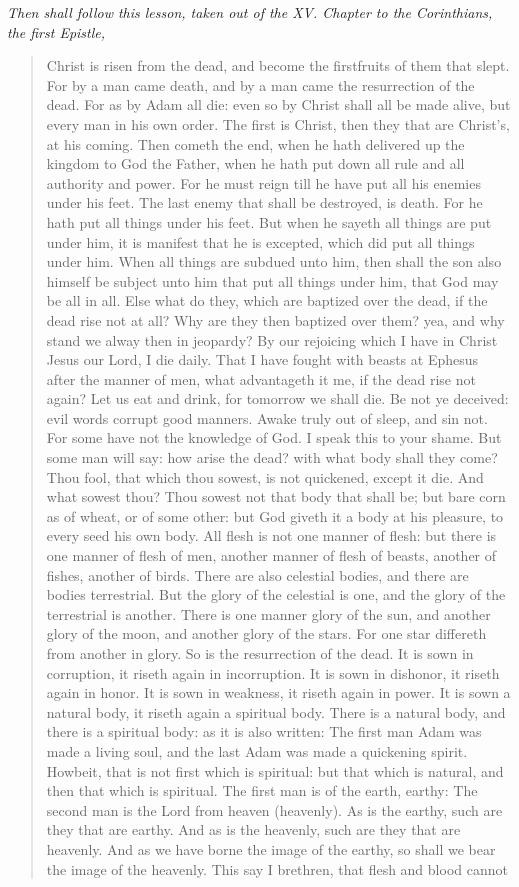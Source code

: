 \documentclass[
]{book}
\begin{document}
\emph{Then shall follow this lesson, taken out of the XV. Chapter to the Corinthians, the first Epistle,}

\begin{quote}
Christ is risen from the dead, and become the firstfruits of them that slept. For by a man came death, and by a man came the resurrection of the dead. For as by Adam all die: even so by Christ shall all be made alive, but every man in his own order. The first is Christ, then they that are Christ's, at his coming. Then cometh the end, when he hath delivered up the kingdom to God the Father, when he hath put down all rule and all authority and power. For he must reign till he have put all his enemies under his feet. The last enemy that shall be destroyed, is death. For he hath put all things under his feet. But when he sayeth all things are put under him, it is manifest that he is excepted, which did put all things under him. When all things are subdued unto him, then shall the son also himself be subject unto him that put all things under him, that God may be all in all. Else what do they, which are baptized over the dead, if the dead rise not at all? Why are they then baptized over them? yea, and why stand we alway then in jeopardy? By our rejoicing which I have in Christ Jesus our Lord, I die daily. That I have fought with beasts at Ephesus after the manner of men, what advantageth it me, if the dead rise not again? Let us eat and drink, for tomorrow we shall die. Be not ye deceived: evil words corrupt good manners. Awake truly out of sleep, and sin not. For some have not the knowledge of God. I speak this to your shame. But some man will say: how arise the dead? with what body shall they come? Thou fool, that which thou sowest, is not quickened, except it die. And what sowest thou? Thou sowest not that body that shall be; but bare corn as of wheat, or of some other: but God giveth it a body at his pleasure, to every seed his own body. All flesh is not one manner of flesh: but there is one manner of flesh of men, another manner of flesh of beasts, another of fishes, another of birds. There are also celestial bodies, and there are bodies terrestrial. But the glory of the celestial is one, and the glory of the terrestrial is another. There is one manner glory of the sun, and another glory of the moon, and another glory of the stars. For one star differeth from another in glory. So is the resurrection of the dead. It is sown in corruption, it riseth again in incorruption. It is sown in dishonor, it riseth again in honor. It is sown in weakness, it riseth again in power. It is sown a natural body, it riseth again a spiritual body. There is a natural body, and there is a spiritual body: as it is also written: The first man Adam was made a living soul, and the last Adam was made a quickening spirit. Howbeit, that is not first which is spiritual: but that which is natural, and then that which is spiritual. The first man is of the earth, earthy: The second man is the Lord from heaven (heavenly). As is the earthy, such are they that are earthy. And as is the heavenly, such are they that are heavenly. And as we have borne the image of the earthy, so shall we bear the image of the heavenly. This say I brethren, that flesh and blood cannot 
\end{quote}
\end{document}
